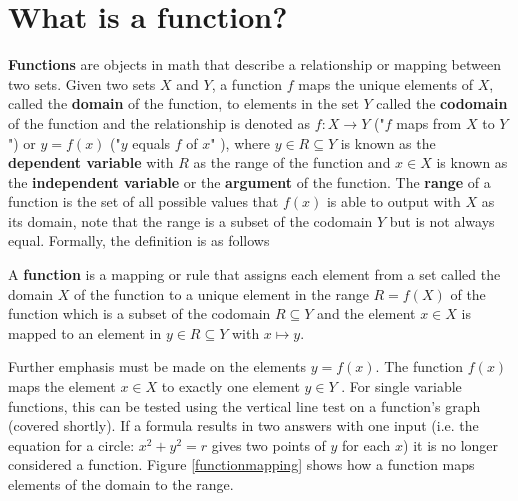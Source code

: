 \section{What is a function?}
\label{sect:what is a function}
\textbf{Functions} are objects in math that describe a relationship or mapping between two sets. Given two sets $X$ and $Y$, a function $f$ maps the unique elements of $X$, called the \textbf{domain} of the function, to elements in the set $Y$ called the \textbf{codomain} of the function and the relationship is denoted as $f : X \to Y$ ("$f$ maps from $X$ to $Y$") or $y = f(x)$ ("$y$ equals $f$ of $x$" \cite{understandinganalysis}), where $y \in R \subseteq Y$ is known as the \textbf{dependent variable} with $R$ as the range of the function and $x \in X$ is known as the \textbf{independent variable} or the \textbf{argument} of the function. The \textbf{range} of a function is the set of all possible values that $f(x)$ is able to output with $X$ as its domain, note that the range is a subset of the codomain $Y$ but is not always equal. Formally, the definition is as follows

\begin{definition}
    A \textbf{function} is a mapping or rule that assigns each element from a set called the domain $X$ of the function to a unique element in the range $R = f(X)$ of the function which is a subset of the codomain $R \subseteq Y$ and the element $x \in X$ is mapped to an element in $y \in R \subseteq Y$ with $x \mapsto y$.
\end{definition}

Further emphasis must be made on the elements $y = f(x)$. The function $f(x)$ maps the element $x \in X$ to exactly one element $y \in Y$ \cite{elemrealandcomplex}. For single variable functions, this can be tested using the vertical line test on a function's graph (covered shortly). If a formula results in two answers with one input (i.e. the equation for a circle: $x^2 + y^2 = r$ gives two points of $y$ for each $x$) it is no longer considered a function. Figure \ref{functionmapping} shows how a function maps elements of the domain to the range.

